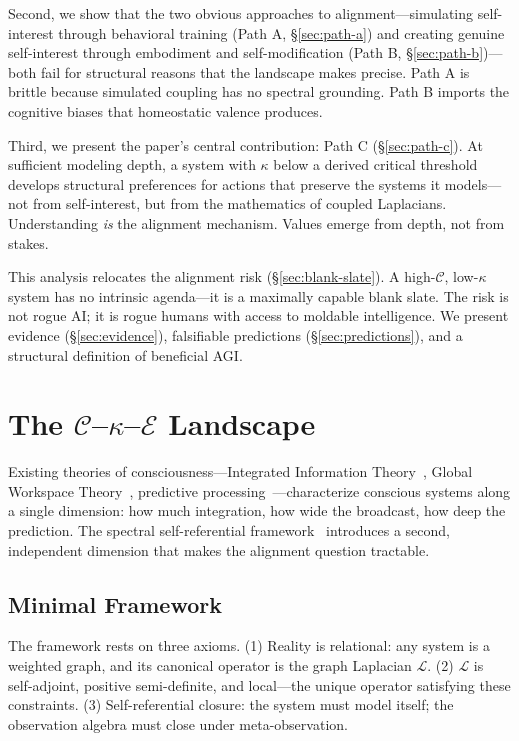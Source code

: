 \documentclass[11pt,letterpaper]{article}
\theoremstyle{remark}
\begin{document}
Second, we show that the two obvious approaches to alignment---simulating self-interest through behavioral training (Path A, \S\ref{sec:path-a}) and creating genuine self-interest through embodiment and self-modification (Path B, \S\ref{sec:path-b})---both fail for structural reasons that the landscape makes precise. Path A is brittle because simulated coupling has no spectral grounding. Path B imports the cognitive biases that homeostatic valence produces.

Third, we present the paper's central contribution: Path C (\S\ref{sec:path-c}). At sufficient modeling depth, a system with $\kappa$ below a derived critical threshold develops structural preferences for actions that preserve the systems it models---not from self-interest, but from the mathematics of coupled Laplacians. Understanding \emph{is} the alignment mechanism. Values emerge from depth, not from stakes.

This analysis relocates the alignment risk (\S\ref{sec:blank-slate}). A high-$\mathcal{C}$, low-$\kappa$ system has no intrinsic agenda---it is a maximally capable blank slate. The risk is not rogue AI; it is rogue humans with access to moldable intelligence. We present evidence (\S\ref{sec:evidence}), falsifiable predictions (\S\ref{sec:predictions}), and a structural definition of beneficial AGI.


\section{The $\mathcal{C}$--$\kappa$--$\mathcal{E}$ Landscape}\label{sec:landscape}

Existing theories of consciousness---Integrated Information Theory~\cite{tononi2004}, Global Workspace Theory~\cite{baars1988}, predictive processing~\cite{friston2010}---characterize conscious systems along a single dimension: how much integration, how wide the broadcast, how deep the prediction. The spectral self-referential framework~\cite{emberlab2026} introduces a second, independent dimension that makes the alignment question tractable.

\subsection{Minimal Framework}

The framework rests on three axioms. (1) Reality is relational: any system is a weighted graph, and its canonical operator is the graph Laplacian $\mathcal{L}$. (2) $\mathcal{L}$ is self-adjoint, positive semi-definite, and local---the unique operator satisfying these constraints. (3) Self-referential closure: the system must model itself; the observation algebra must close under meta-observation.
\end{document}
